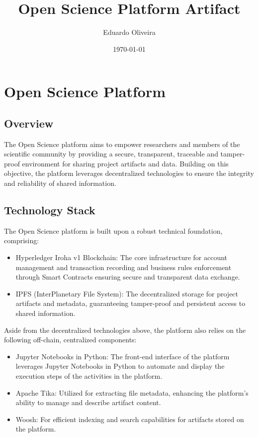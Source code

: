 \documentclass{article}
\title{Open Science Platform Artifact}
\author{Eduardo Oliveira}
\date{\today}
\begin{document}
\maketitle

\section{Open Science Platform}

\subsection{Overview}

The Open Science platform aims to empower researchers and members of the scientific community by providing a secure, transparent, traceable and tamper-proof environment for sharing project artifacts and data. Building on this objective, the platform leverages decentralized technologies to ensure the integrity and reliability of shared information.


\subsection{Technology Stack}

The Open Science platform is built upon a robust technical foundation, comprising:

\begin{itemize}
    \item Hyperledger Iroha v1 Blockchain: The core infrastructure for account management and transaction recording and business rules enforcement through Smart Contracts ensuring secure and transparent data exchange.
    \item IPFS (InterPlanetary File System): The decentralized storage for project artifacts and metadata, guaranteeing tamper-proof and persistent access to shared information.
\end{itemize}


Aside from the decentralized technologies above, the platform also relies on the following off-chain, centralized components:

\begin{itemize}
    \item Jupyter Notebooks in Python: The front-end interface of the platform leverages Jupyter Notebooks in Python to automate and display the execution steps of the activities in the platform.
    \item Apache Tika: Utilized for extracting file metadata, enhancing the platform's ability to manage and describe artifact content.
    \item Woosh: For efficient indexing and search capabilities for artifacts stored on the platform.
\end{itemize}
\end{document}
